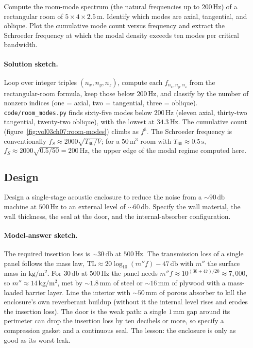 \begin{exercise}
Compute the room-mode spectrum (the natural frequencies up to
$200\,\si{\hertz}$) of a rectangular room of $5 \times 4 \times 2.5\,
\si{\meter}$. Identify which modes are axial, tangential, and
oblique. Plot the cumulative mode count versus frequency and
extract the Schroeder frequency at which the modal density exceeds
ten modes per critical bandwidth.
\paragraph{Solution sketch.} Loop over integer triples $(n_x,n_y,n_z)$,
compute each $f_{n_x,n_y,n_z}$ from the rectangular-room formula, keep
those below $200\,\si{\hertz}$, and classify by the number of nonzero
indices (one = axial, two = tangential, three = oblique).
\texttt{code/room\_modes.py} finds sixty-five modes below
$200\,\si{\hertz}$ (eleven axial, thirty-two tangential, twenty-two
oblique), with the lowest at $34.3\,\si{\hertz}$. The cumulative count
(figure~\ref{fig:vol03ch07:room-modes}) climbs as $f^3$. The Schroeder
frequency is conventionally $f_S \approx 2000\sqrt{T_{60}/V}$; for a
$50\,\si{\meter\cubed}$ room with $T_{60}\approx 0.5\,\si{\second}$,
$f_S \approx 2000\sqrt{0.5/50} = 200\,\si{\hertz}$, the upper edge of
the modal regime computed here.
\end{exercise}

\subsection*{Design}

\begin{exercise}
Design a single-stage acoustic enclosure to reduce the noise from a
$\sim 90\,\si{\decibel}$ machine at $500\,\si{\hertz}$ to an
external level of $\sim 60\,\si{\decibel}$. Specify the wall
material, the wall thickness, the seal at the door, and the
internal-absorber configuration.
\paragraph{Model-answer sketch.} The required insertion loss is
$\sim 30\,\si{\decibel}$ at $500\,\si{\hertz}$. The transmission loss
of a single panel follows the mass law, $\text{TL} \approx
20\log_{10}(m''f) - 47\,\si{\decibel}$ with $m''$ the surface mass in
$\si{\kilogram\per\meter\squared}$. For $30\,\si{\decibel}$ at
$500\,\si{\hertz}$ the panel needs $m''f \approx 10^{(30+47)/20}
\approx 7{,}000$, so $m'' \approx 14\,\si{\kilogram\per\meter\squared}$,
met by $\sim 1.8\,\si{\milli\meter}$ of steel or
$\sim 16\,\si{\milli\meter}$ of plywood with a mass-loaded barrier
layer. Line the interior with $\sim 50\,\si{\milli\meter}$ of porous
absorber to kill the enclosure's own reverberant buildup (without it
the internal level rises and erodes the insertion loss). The door is
the weak path: a single $1\,\si{\milli\meter}$ gap around its perimeter
can drop the insertion loss by ten decibels or more, so specify a
compression gasket and a continuous seal. The lesson: the enclosure is
only as good as its worst leak.
\end{exercise}


